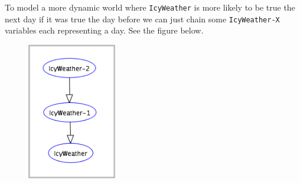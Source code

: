 To model a more dynamic world where \texttt{IcyWeather} is more likely to be true the next day if it was true the day before we can just chain some \texttt{IcyWeather-X} variables each representing a day. See the figure below.

\begin{figure}[!ht]
  \centering
  \includegraphics[height=6cm]{img/part4_4.png}
\end{figure} 

